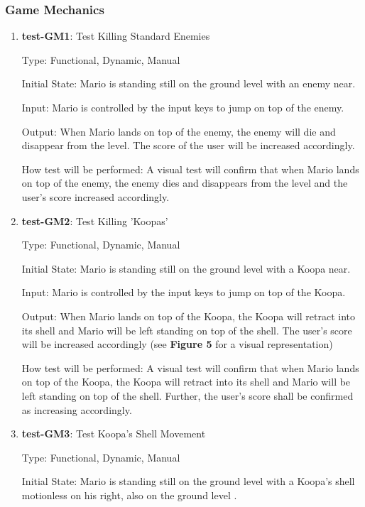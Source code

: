 \documentclass[12pt, titlepage]{article}
\begin{document}
\subsubsection{Game Mechanics}

\begin{enumerate}

\item{\textbf{test-GM1}: Test Killing Standard Enemies\\}

Type: Functional, Dynamic, Manual
					
Initial State: Mario is standing still on the ground level with an enemy near.
					
Input: Mario is controlled by the input keys to jump on top of the enemy.
					
Output: When Mario lands on top of the enemy, the enemy will die and disappear from the level. The score of the user will be increased accordingly.
					
How test will be performed: A visual test will confirm that when Mario lands on top of the enemy, the enemy dies and disappears from the level and the user's score increased accordingly.

\item{\textbf{test-GM2}: Test Killing 'Koopas'\\}

Type: Functional, Dynamic, Manual
					
Initial State: Mario is standing still on the ground level with a Koopa near.
					
Input: Mario is controlled by the input keys to jump on top of the Koopa.
					
Output: When Mario lands on top of the Koopa, the Koopa will retract into its shell and Mario will be left standing on top of the shell. The user's score will be increased accordingly (see \textbf{Figure 5} for a visual representation)
					
How test will be performed: A visual test will confirm that when Mario lands on top of the Koopa, the Koopa will retract into its shell and Mario will be left standing on top of the shell. Further, the user's score shall be confirmed as increasing accordingly.

\item{\textbf{test-GM3}: Test Koopa's Shell Movement\\}

Type: Functional, Dynamic, Manual
					
Initial State: Mario is standing still on the ground level with a Koopa's shell motionless on his right, also on the ground level .
					

\end{enumerate}
\end{document}
